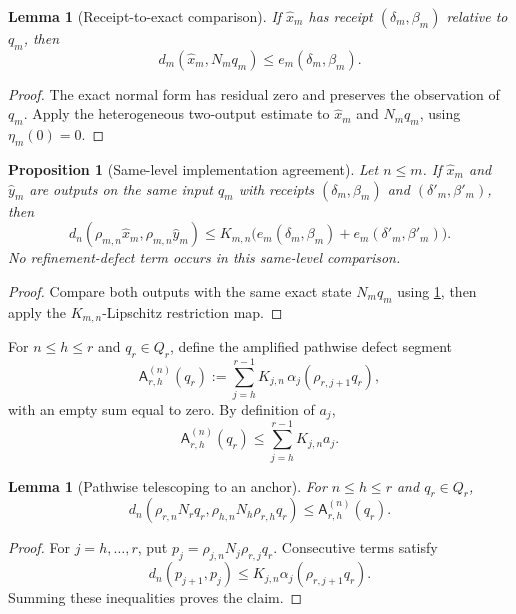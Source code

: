 \documentclass[11pt]{article}
\newtheorem{lemma}[theorem]{Lemma}
\newtheorem{proposition}[theorem]{Proposition}
\theoremstyle{definition}
\theoremstyle{remark}
\numberwithin{equation}{section}
\begin{document}
\begin{lemma}[Receipt-to-exact comparison]\label{lem:receipt-to-exact}
If $\widehat x_m$ has receipt $(\delta_m,\beta_m)$ relative to $q_m$, then
\begin{equation}\label{eq:receipt-to-exact}
 d_m(\widehat x_m,N_mq_m)
 \le e_m(\delta_m,\beta_m).
\end{equation}
\end{lemma}

\begin{proof}
The exact normal form has residual zero and preserves the observation of
$q_m$.  Apply the heterogeneous two-output estimate to $\widehat x_m$ and
$N_mq_m$, using $\eta_m(0)=0$.
\end{proof}

\begin{proposition}[Same-level implementation agreement]
\label{prop:same-level-implementations}
Let $n\le m$.  If $\widehat x_m$ and $\widehat y_m$ are outputs on the same
input $q_m$ with receipts $(\delta_m,\beta_m)$ and
$(\delta'_m,\beta'_m)$, then
\[
 d_n(\rho_{m,n}\widehat x_m,\rho_{m,n}\widehat y_m)
 \le
 K_{m,n}\bigl(
 e_m(\delta_m,\beta_m)+e_m(\delta'_m,\beta'_m)
 \bigr).
\]
No refinement-defect term occurs in this same-level comparison.
\end{proposition}

\begin{proof}
Compare both outputs with the same exact state $N_mq_m$ using
\cref{lem:receipt-to-exact}, then apply the $K_{m,n}$-Lipschitz restriction
map.
\end{proof}

For $n\le h\le r$ and $q_r\in Q_r$, define the amplified pathwise defect
segment
\[
 \mathsf A_{r,h}^{(n)}(q_r)
 :=
 \sum_{j=h}^{r-1}
 K_{j,n}\,
 \alpha_j\!\left(\rho_{r,j+1}q_r\right),
\]
with an empty sum equal to zero.  By definition of $a_j$,
\[
 \mathsf A_{r,h}^{(n)}(q_r)
 \le
 \sum_{j=h}^{r-1}K_{j,n}a_j.
\]

\begin{lemma}[Pathwise telescoping to an anchor]\label{lem:pathwise-anchor}
For $n\le h\le r$ and $q_r\in Q_r$,
\[
 d_n\!\left(
 \rho_{r,n}N_rq_r,
 \rho_{h,n}N_h\rho_{r,h}q_r
 \right)
 \le
 \mathsf A_{r,h}^{(n)}(q_r).
\]
\end{lemma}

\begin{proof}
For $j=h,\ldots,r$, put
$p_j=\rho_{j,n}N_j\rho_{r,j}q_r$.  Consecutive terms satisfy
\[
 d_n(p_{j+1},p_j)
 \le
 K_{j,n}\alpha_j(\rho_{r,j+1}q_r).
\]
Summing these inequalities proves the claim.
\end{proof}
\end{document}
